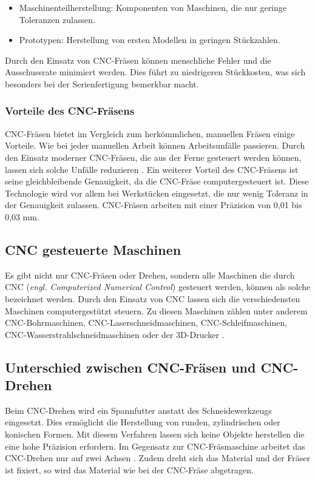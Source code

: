 \begin{itemize}
	\item Maschinenteilherstellung: Komponenten von Maschinen, die nur geringe Toleranzen zulassen.
	\item Prototypen: Herstellung von ersten Modellen in geringen Stückzahlen.
\end{itemize}

Durch den Einsatz von CNC-Fräsen können menschliche Fehler und die Ausschussrate minimiert werden. Dies führt zu niedrigeren Stückkosten, was sich besonders bei der Serienfertigung bemerkbar macht.\\  \parencite{CNCFraesen3}


\subsubsection{Vorteile des CNC-Fräsens}
CNC-Fräsen bietet im Vergleich zum herkömmlichen, manuellen Fräsen einige Vorteile. Wie bei jeder manuellen Arbeit können Arbeitsunfälle passieren. Durch den Einsatz moderner CNC-Fräsen, die aus der Ferne gesteuert werden können, lassen sich solche Unfälle reduzieren \parencite{CNCFraesenVorteile}. Ein weiterer Vorteil des CNC-Fräsens ist seine gleichbleibende Genauigkeit, da die CNC-Fräse computergesteuert ist. Diese Technologie wird vor allem bei Werkstücken eingesetzt, die nur wenig Toleranz in der Genauigkeit zulassen. CNC-Fräsen arbeiten mit einer Präzision von 0,01 bis 0,03 mm. \\


\subsection{CNC gesteuerte Maschinen}
Es gibt nicht nur CNC-Fräsen oder Drehen, sondern alle Maschinen die durch CNC (\textit{engl. Computerized Numerical Control}) gesteuert werden, können als solche bezeichnet werden. Durch den Einsatz von CNC lassen sich die verschiedensten Maschinen computergestützt steuern. Zu diesen Maschinen zählen unter anderem CNC-Bohrmaschinen,  CNC-Laserschneidmaschinen, CNC-Schleifmaschinen, CNC-Wasserstrahlschneidmaschinen oder der 3D-Drucker \parencite{ArtenCNCMaschinen}
. \\

\newpage
\subsection{Unterschied zwischen CNC-Fräsen und CNC-Drehen}
Beim CNC-Drehen wird ein Spannfutter anstatt des Schneidewerkzeugs eingesetzt. Dies ermöglicht die Herstellung von runden, zylindrischen oder konischen Formen. Mit diesem Verfahren lassen sich keine Objekte herstellen die eine hohe Präzision erfordern. Im Gegensatz zur CNC-Fräsmaschine arbeitet das CNC-Drehen nur auf zwei Achsen \parencite{CNCDrehenUnterschied}. Zudem dreht sich das Material und der Fräser ist fixiert, so wird das Material wie bei der CNC-Fräse abgetragen. \\

